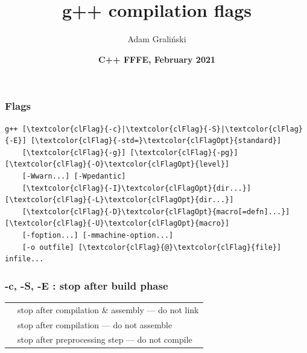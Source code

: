\documentclass[aspectratio=169]{beamer}
\title[LTN02 :: CompilationFlags]{g++ compilation flags}
\author{Adam Graliński}
\date[FFFE\_21]{\textbf{C++ {\color{red}F}{\color{blue}F}{\color{green}F}{\color{yellow}E}, February 2021}}
\begin{document}
{
\begin{frame}
\titlepage{}
\end{frame}
}

\begin{frame}[fragile]
\frametitle{Flags}

\centering
\begin{BVerbatim}[commandchars=\\\{\}]
g++ [\textcolor{clFlag}{-c}|\textcolor{clFlag}{-S}|\textcolor{clFlag}{-E}] [\textcolor{clFlag}{-std=}\textcolor{clFlagOpt}{standard}]
    [\textcolor{clFlag}{-g}] [\textcolor{clFlag}{-pg}] [\textcolor{clFlag}{-O}\textcolor{clFlagOpt}{level}]
    [-Wwarn...] [-Wpedantic]
    [\textcolor{clFlag}{-I}\textcolor{clFlagOpt}{dir...}] [\textcolor{clFlag}{-L}\textcolor{clFlagOpt}{dir...}]
    [\textcolor{clFlag}{-D}\textcolor{clFlagOpt}{macro[=defn]...}] [\textcolor{clFlag}{-U}\textcolor{clFlagOpt}{macro}]
    [-foption...] [-mmachine-option...]
    [-o outfile] [\textcolor{clFlag}{@}\textcolor{clFlag}{file}] infile...
\end{BVerbatim}
\end{frame}

\begin{frame}
\frametitle{-c, -S, -E : stop after build phase}
\begin{table}
\begin{tabular}{l l}
\toprule
\texttt{\color{clFlag}{-c}} & stop after compilation \& assembly --- do not link \\ [3ex]
\texttt{\color{clFlag}{-S}} & stop after compilation --- do not assemble \\ [3ex]
\texttt{\color{clFlag}{-E}} & stop after preprocessing step --- do not compile \\ [3ex]
\bottomrule
\end{tabular}
\end{table}
\end{frame}
\end{document}
